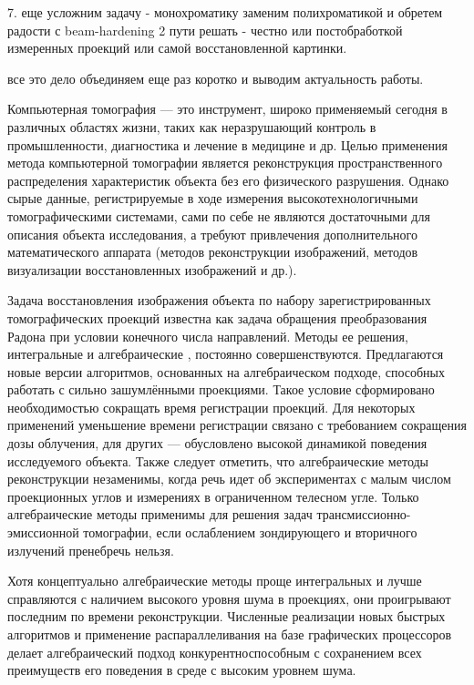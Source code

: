 7. еще усложним задачу - монохроматику заменим полихроматикой и обретем радости с beam-hardening 2 пути решать - честно или постобработкой измеренных проекций или самой восстановленной картинки.

все это дело объединяем еще раз коротко и выводим актуальность работы.



Компьютерная томография --- это инструмент, широко применяемый сегодня в различных областях жизни, таких как неразрушающий контроль в промышленности, диагностика и лечение  в медицине и др. Целью применения метода компьютерной томографии является реконструкция пространственного распределения характеристик объекта без его физического разрушения. Однако сырые данные, регистрируемые в ходе измерения высокотехнологичными томографическими системами, сами по себе не являются достаточными для описания объекта исследования, а требуют привлечения дополнительного математического аппарата (методов реконструкции изображений, методов визуализации восстановленных изображений и др.). 

Задача восстановления изображения объекта по набору зарегистрированных томографических проекций известна как задача обращения преобразования Радона при условии конечного числа направлений. Методы ее решения, интегральные \cite{herman2013mathematical} и алгебраические \cite{algebraic_methods}, постоянно совершенствуются. Предлагаются новые версии алгоритмов, основанных на алгебраическом подходе, способных работать с сильно зашумлёнными проекциями. Такое условие сформировано необходимостью сокращать время регистрации проекций. Для некоторых применений уменьшение времени регистрации связано с требованием сокращения дозы облучения, для других --- обусловлено высокой динамикой поведения исследуемого объекта. Также следует отметить, что алгебраические методы реконструкции незаменимы, когда речь идет об экспериментах с малым числом проекционных углов и измерениях в ограниченном телесном угле. Только алгебраические методы применимы для решения задач трансмиссионно-эмиссионной томографии, если ослаблением зондирующего и вторичного излучений пренебречь нельзя.

Хотя концептуально алгебраические методы проще интегральных и лучше справляются с наличием высокого уровня шума в проекциях, они проигрывают последним по времени реконструкции. Численные реализации новых быстрых алгоритмов и применение распараллеливания на базе графических процессоров делает алгебраический подход конкурентноспособным с сохранением всех преимуществ его поведения в среде с высоким уровнем шума.

